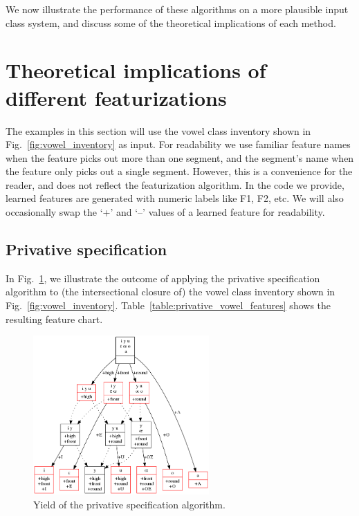 \documentclass[12pt, oneside]{article}   	%
\begin{document}
We now illustrate the performance of these algorithms on a more plausible input class system, and discuss some of the theoretical implications of each method.

\FloatBarrier
\section{Theoretical implications of different featurizations}
\label{sec:theoretical_implications}

The examples in this section will use the vowel class inventory shown in Fig.~\ref{fig:vowel_inventory} as input. For readability we use familiar feature names when the feature picks out more than one segment, and the segment's name when the feature only picks out a single segment. However, this is a convenience for the reader, and does not reflect the featurization algorithm. In the code we provide, learned features are generated with numeric labels like F1, F2, etc. We will also occasionally swap the `+' and `--' values of a learned feature for readability.

\subsection{Privative specification}

In Fig.~\ref{fig:privative}, we illustrate the outcome of applying the privative specification algorithm to (the intersectional closure of) the vowel class inventory shown in Fig.~\ref{fig:vowel_inventory}. Table~\ref{table:privative_vowel_features} shows the resulting feature chart.

\begin{figure}[htb!]
	\centering
	\includegraphics[width=0.6\textwidth]{vowel_inventory_privative.png}
	\caption{Yield of the privative specification algorithm.}
	\label{fig:privative}
\end{figure}
\end{document}
